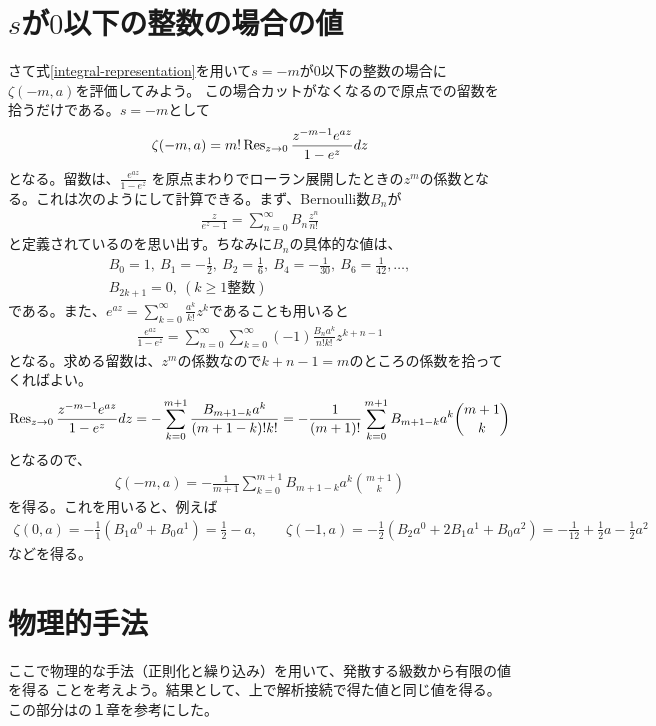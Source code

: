 \documentclass[12pt,a4paper,dvipdfmx]{jlreq}
\begin{document}
\section{$s$が$0$以下の整数の場合の値}
さて式\eqref{integral-representation}を用いて$s=-m$が$0$以下の整数の場合に$\zeta(-m,a)$を評価してみよう。
この場合カットがなくなるので原点での留数を拾うだけである。$s=-m$として
\begin{align}
  \zeta(-m,a)=m!\Res_{z\to 0}\frac{z^{-m-1}e^{az}}{1-e^{z}}dz
  \label{residue}
\end{align}
となる。留数は、$\frac{e^{az}}{1-e^{z}}$ を原点まわりでローラン展開したときの$z^m$の係数となる。これは次のようにして計算できる。まず、Bernoulli数$B_n$が
\begin{align}
  \frac{z}{e^z-1}=\sum_{n=0}^{\infty}B_{n}\frac{z^n}{n!}
\end{align}
と定義されているのを思い出す。ちなみに$B_n$の具体的な値は、
\begin{align}
  B_0=1,\ B_1=-\frac{1}{2},\ B_2=\frac{1}{6},\ B_4=-\frac{1}{30},\ B_6=\frac{1}{42},\dots,\\
  B_{2k+1}=0,\ (k\ge 1 \text{整数})
\end{align}
である。また、$e^{az}=\sum_{k=0}^{\infty}\frac{a^k}{k!}z^k$であることも用いると
\begin{align}
  \frac{e^{az}}{1-e^{z}}=\sum_{n=0}^{\infty}\sum_{k=0}^{\infty}(-1)\frac{B_n a^k}{n!k!}z^{k+n-1}
\end{align}
となる。求める留数は、$z^{m}$の係数なので$k+n-1=m$のところの係数を拾ってくればよい。
\begin{align}
  \Res_{z\to 0}\frac{z^{-m-1}e^{az}}{1-e^{z}}dz
  =-\sum_{k=0}^{m+1}\frac{B_{m+1-k} a^k}{(m+1-k)!k!}
  =-\frac{1}{(m+1)!}\sum_{k=0}^{m+1}B_{m+1-k} a^k\binom{m+1}{k}
\end{align}
となるので、
\begin{align}
  \zeta(-m,a)=-\frac{1}{m+1}\sum_{k=0}^{m+1}B_{m+1-k} a^k\binom{m+1}{k}
\end{align}
を得る。これを用いると、例えば
\begin{align}
  \zeta(0,a)=-\frac11(B_1a^0+B_0a^1)=\frac12-a,\qquad
  \zeta(-1,a)=-\frac12(B_2a^0+2B_1a^1+B_0a^2)=-\frac{1}{12}+\frac12 a-\frac12a^2
\end{align}
などを得る。
\section{物理的手法}

ここで物理的な手法（正則化と繰り込み）を用いて、発散する級数から有限の値を得る
ことを考えよう。結果として、上で解析接続で得た値と同じ値を得る。
この部分は\cite{Polchinski:1998rq}の１章を参考にした。
\end{document}
